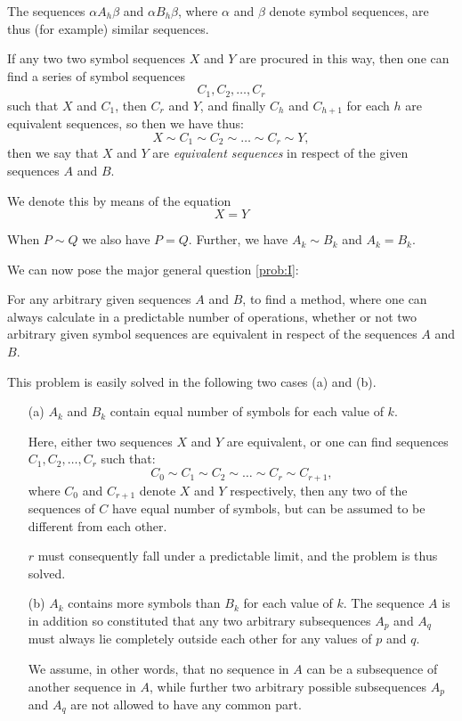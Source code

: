 The sequences $\alpha A_h \beta$ and $\alpha B_h \beta$, where
$\alpha$ and $\beta$ denote symbol sequences, are thus (for example) similar
sequences.

If any two two symbol sequences $X$ and $Y$ are procured in this way, then one
can find a series of symbol sequences
$$C_1, C_2, \ldots, C_r$$
such that $X$ and $C_1$, then $C_r$ and $Y$, and finally $C_h$ and
$C_{h+1}$ for each $h$ are equivalent sequences, so then we have thus:
$$X \sim C_1 \sim C_2 \sim \ldots \sim C_r \sim Y,$$
then we say that $X$ and $Y$ are \emph{equivalent sequences} in respect of
the given sequences $A$ and $B$.

We denote this by means of the equation
$$X = Y$$

When $P \sim Q$ we also have $P = Q$.  Further, we have $A_k \sim B_k$
and $A_k = B_k$.

\bigskip

We can now pose the major general question \ref{prob:I}:

\begin{problem}
For any arbitrary given sequences $A$ and $B$, to find a method, where
one can always calculate in a predictable number of operations,
whether or not two arbitrary given symbol sequences are equivalent in
respect of the sequences $A$ and $B$.
\label{prob:I}
\end{problem}

This problem is easily solved in the following two cases (a) and (b).

\begin{enumerate}
\item[(a)] $A_k$ and $B_k$ contain equal number of symbols for each value of
$k$.

Here, either two sequences $X$ and $Y$ are equivalent, or one can find
sequences $C_1, C_2, \ldots, C_r$ such that:
$$C_0 \sim C_1 \sim C_2 \sim \ldots \sim C_r \sim C_{r+1},$$
where $C_0$ and $C_{r+1}$ denote $X$ and $Y$ respectively, then any
two of the sequences of $C$ have equal number of symbols, but can be
assumed to be different from each other.

$r$ must consequently fall under a predictable limit, and the problem
is thus solved.

\item[(b)] $A_k$ contains more symbols than $B_k$ for each value of
  $k$. 
The sequence $A$ is in addition so constituted that any two arbitrary
subsequences $A_p$ and $A_q$ must always lie completely outside each
other for any values of $p$ and $q$.

We assume, in other words, that no sequence in $A$ can be a subsequence
of another sequence in $A$, while further two arbitrary possible
subsequences $A_p$ and $A_q$ are not allowed to have any common part.
\end{enumerate}

